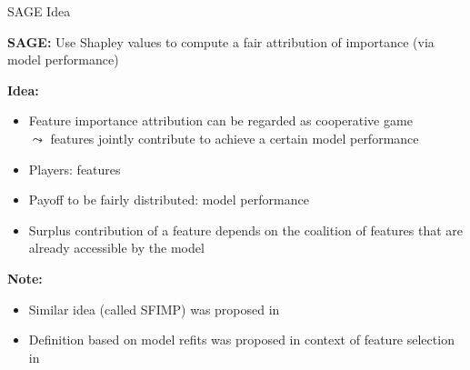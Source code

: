 \documentclass[10pt,compress,t,notes=noshow, xcolor=table]{beamer}
\begin{document}
\begin{frame}{SAGE Idea 
}

\textbf{SAGE:} %
Use Shapley values to compute a fair attribution of importance (via model performance)\\
\lz

\textbf{Idea:} 
\begin{itemize}
    \item Feature importance attribution can be regarded as cooperative game \\
    $\leadsto$ features jointly contribute to achieve a certain model performance
    \item Players: features
    \item Payoff to be fairly distributed: model performance
    \item Surplus contribution of a feature depends on the coalition of features that are already accessible by the model
\end{itemize}
\lz

\textbf{Note:} 
\begin{itemize}
    \item Similar idea (called SFIMP) was proposed in 
    \item Definition based on model refits was proposed in context of feature selection in 
\end{itemize}

\lz

  
\end{frame}
\end{document}
